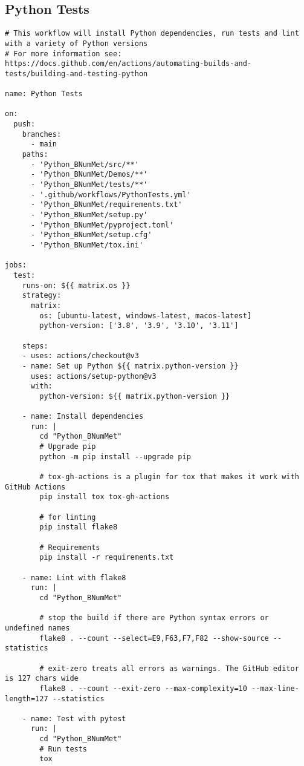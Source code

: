 \subsection*{Python Tests}
\begin{lstlisting}
# This workflow will install Python dependencies, run tests and lint with a variety of Python versions
# For more information see: https://docs.github.com/en/actions/automating-builds-and-tests/building-and-testing-python

name: Python Tests

on:
  push:
    branches:
      - main
    paths:
      - 'Python_BNumMet/src/**'
      - 'Python_BNumMet/Demos/**'
      - 'Python_BNumMet/tests/**'
      - '.github/workflows/PythonTests.yml'
      - 'Python_BNumMet/requirements.txt'
      - 'Python_BNumMet/setup.py'
      - 'Python_BNumMet/pyproject.toml'
      - 'Python_BNumMet/setup.cfg'
      - 'Python_BNumMet/tox.ini'

jobs:
  test:
    runs-on: ${{ matrix.os }}
    strategy:
      matrix:
        os: [ubuntu-latest, windows-latest, macos-latest]
        python-version: ['3.8', '3.9', '3.10', '3.11']

    steps:
    - uses: actions/checkout@v3
    - name: Set up Python ${{ matrix.python-version }}
      uses: actions/setup-python@v3
      with:
        python-version: ${{ matrix.python-version }}

    - name: Install dependencies
      run: |
        cd "Python_BNumMet"
        # Upgrade pip
        python -m pip install --upgrade pip 

        # tox-gh-actions is a plugin for tox that makes it work with GitHub Actions
        pip install tox tox-gh-actions 

        # for linting
        pip install flake8 

        # Requirements
        pip install -r requirements.txt

    - name: Lint with flake8
      run: |
        cd "Python_BNumMet"

        # stop the build if there are Python syntax errors or undefined names
        flake8 . --count --select=E9,F63,F7,F82 --show-source --statistics

        # exit-zero treats all errors as warnings. The GitHub editor is 127 chars wide
        flake8 . --count --exit-zero --max-complexity=10 --max-line-length=127 --statistics

    - name: Test with pytest
      run: |
        cd "Python_BNumMet"
        # Run tests
        tox
\end{lstlisting}

